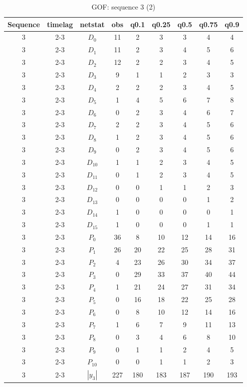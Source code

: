 \documentclass[aspectratio=169,ignorenonframetext,9pt]{beamer}
\theoremstyle{plain}
\theoremstyle{definition}
\begin{document}
\clearpage
\begin{table}[h!]
    \centering
        \begin{tabular}{c| c | c | c | c |c |c |c |c }
            Sequence& timelag & netstat & obs & q0.1 & q0.25 & q0.5 & q0.75 & q0.9 \\
            \hline \hline
            3 & 2-3 & $D_0$ & 11 &  2& 3& 3& 4& 4 \\
            3 & 2-3 & $D_1$ & 11 &  2& 3& 4& 5& 6 \\
            3 & 2-3 & $D_2$ & 12 &  2& 2& 3& 4& 5 \\
            3 & 2-3 & $D_3$ & 9 &  1& 1& 2& 3& 3 \\
            3 & 2-3 & $D_4$ & 2 &  2& 2& 3& 4& 5 \\
            3 & 2-3 & $D_5$ & 1 &  4& 5& 6& 7& 8 \\
            3 & 2-3 & $D_6$ & 0 &  2& 3& 4& 6& 7 \\
            3 & 2-3 & $D_7$ & 2 &  2& 3& 4& 5& 6 \\
            3 & 2-3 & $D_8$ & 1 &  2& 3& 4& 5& 6 \\
            3 & 2-3 & $D_9$ & 0 &  2& 3& 4& 5& 6 \\
            3 & 2-3 & $D_{10}$ & 1 &  1& 2& 3& 4& 5 \\
            3 & 2-3 & $D_{11}$ & 0 &  1& 2& 3& 4& 5 \\
            3 & 2-3 & $D_{12}$ & 0 &  0& 1& 1& 2& 3 \\
            3 & 2-3 & $D_{13}$ & 0 &  0& 0& 0& 1& 2 \\
            3 & 2-3 & $D_{14}$ & 1 &  0& 0& 0& 0& 1 \\
            3 & 2-3 & $D_{15}$ & 1 &  0& 0& 0& 1& 1 \\
            3 & 2-3 & $P_0$ & 36 & 8& 10& 12& 14& 16 \\
            3 & 2-3 & $P_1$ & 26 & 20& 22& 25& 28& 31 \\
            3 & 2-3 & $P_2$ & 4 & 23& 26& 30& 34& 37 \\
            3 & 2-3 & $P_3$ & 0 & 29& 33& 37& 40& 44 \\
            3 & 2-3 & $P_4$ & 1 & 21& 24& 27& 31& 34 \\
            3 & 2-3 & $P_5$ & 0 & 16& 18& 22& 25& 28 \\
            3 & 2-3 & $P_6$ & 0 &  8& 10& 12& 14& 16 \\
            3 & 2-3 & $P_7$ & 1 &  6& 7& 9& 11& 13 \\
            3 & 2-3 & $P_8$ & 0 &  3& 4& 6& 8& 10 \\
            3 & 2-3 & $P_9$ & 0 &  1& 1& 2& 4& 5 \\
            3 & 2-3 & $P_10$ & 0 &  0& 1& 1& 2& 3 \\
            3 & 2-3 & $|y_3|$ & 227 &  180& 183& 187& 190& 193 \\
        \end{tabular}
        \caption{GOF: sequence 3 (2)}
    \end{table}
\clearpage
\end{document}
